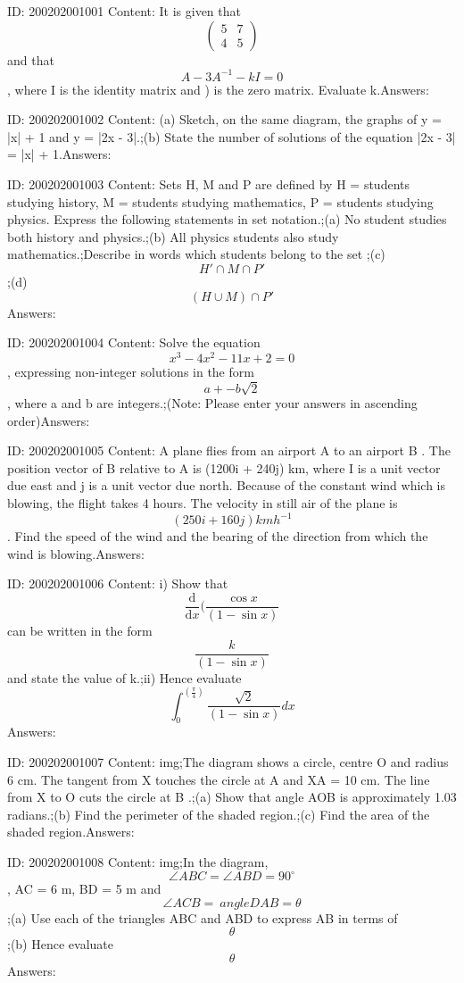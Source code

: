 \documentclass{article}
\begin{document}
ID: 200202001001
Content:
It is given that \[\begin{pmatrix} 5& 7 \\  4&  5\end{pmatrix}\] and that $$A-3A^{-1}-kI=0$$, where I is the identity matrix and ) is the zero matrix. Evaluate k.Answers:

ID: 200202001002
Content:
(a)	Sketch, on the same diagram, the graphs of y = |x| + 1 and y = |2x - 3|.;(b)	State the number of solutions of the equation |2x - 3| = |x| + 1.Answers:

ID: 200202001003
Content:
Sets H, M and P are defined by H = {students studying history}, M = {students studying mathematics}, P = {students studying physics}. Express the following statements in set notation.;(a)	No student studies both history and physics.;(b)	All physics students also study mathematics.;Describe in words which students belong to the set ;(c) $$H'\cap  M \cap  P'$$;(d) $$(H \cup  M) \cap  P'$$Answers:

ID: 200202001004
Content:
Solve the equation $$x^3-4x^2-11x+2=0$$, expressing non-integer solutions in the form $$a +- b\sqrt2$$, where a and b are integers.;(Note: Please enter your answers in ascending order)Answers:

ID: 200202001005
Content:
A plane flies from an airport A to an airport B . The position vector of B relative to A is (1200i + 240j) km, where I is a unit vector due east and j is a unit vector due north. Because of the constant wind which is blowing, the flight takes 4 hours. The velocity in still air of the plane is $$(250i + 160j) kmh^{-1}$$. Find the speed of the wind and the bearing of the direction from which the wind is blowing.Answers:

ID: 200202001006
Content:
i) Show that \[\frac{\mathrm{d} }{\mathrm{d} x}(\frac{\cos x}{(1-\sin x)} \]can be written in the form $$ \frac{k}{(1-\sin x)}$$ and state the value of k.;ii) Hence evaluate $$\int_0^{(\frac{\pi}{4})}\frac{\sqrt2}{(1-\sin x)}dx$$Answers:

ID: 200202001007
Content:
img;The diagram shows a circle, centre O and radius 6 cm. The tangent from X touches the circle at A and XA = 10 cm. The line from X to O cuts the circle at B .;(a)	Show that angle AOB is approximately 1.03 radians.;(b)	Find the perimeter of the shaded region.;(c)	Find the area of the shaded region.Answers:

ID: 200202001008
Content:
img;In the diagram, $$ \angle ABC =  \angle ABD = 90^{\circ}$$, AC = 6 m, BD = 5 m and $$\angle ACB =\ angle DAB = \theta$$;(a)	Use each of the triangles ABC and ABD to express AB in terms of $$\theta$$;(b)	Hence evaluate $$\theta$$Answers:
\end{document}
